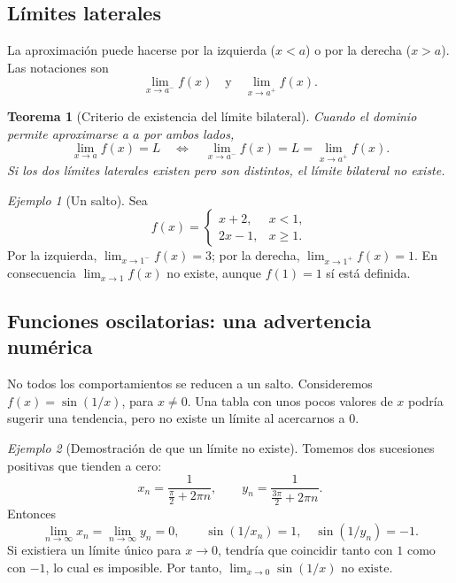 \documentclass[12pt]{article}
\newtheorem{teorema}[definicion]{Teorema}
\theoremstyle{remark}
\newtheorem{ejemplo}{Ejemplo}
\begin{document}
\subsection*{Límites laterales}
La aproximación puede hacerse por la izquierda ($x<a$) o por la derecha ($x>a$). Las notaciones son
\[
 \lim_{x\to a^-}f(x)\quad\text{y}\quad \lim_{x\to a^+}f(x).
\]
\begin{teorema}[Criterio de existencia del límite bilateral]
Cuando el dominio permite aproximarse a $a$ por ambos lados,
\[
 \boxed{\lim_{x\to a}f(x)=L\quad\Longleftrightarrow\quad
 \lim_{x\to a^-}f(x)=L=\lim_{x\to a^+}f(x).}
\]
Si los dos límites laterales existen pero son distintos, el límite bilateral no existe.
\end{teorema}

\begin{ejemplo}[Un salto]
Sea
\[
 f(x)=\begin{cases}x+2,&x<1,\\ 2x-1,&x\ge1.\end{cases}
\]
Por la izquierda, $\lim_{x\to1^-}f(x)=3$; por la derecha, $\lim_{x\to1^+}f(x)=1$. En consecuencia $\lim_{x\to1}f(x)$ no existe, aunque $f(1)=1$ sí está definida.
\end{ejemplo}

\begin{center}
\end{center}

\subsection*{Funciones oscilatorias: una advertencia numérica}
No todos los comportamientos se reducen a un salto. Consideremos $f(x)=\sin(1/x)$, para $x\ne0$. Una tabla con unos pocos valores de $x$ podría sugerir una tendencia, pero no existe un límite al acercarnos a $0$.

\begin{ejemplo}[Demostración de que un límite no existe]
Tomemos dos sucesiones positivas que tienden a cero:
\[
 x_n=\frac{1}{\frac\pi2+2\pi n},\qquad
 y_n=\frac{1}{\frac{3\pi}2+2\pi n}.
\]
Entonces
\[
 \lim_{n\to\infty}x_n=\lim_{n\to\infty}y_n=0,
 \qquad \sin(1/x_n)=1,\quad \sin(1/y_n)=-1.
\]
Si existiera un límite único para $x\to0$, tendría que coincidir tanto con $1$ como con $-1$, lo cual es imposible. Por tanto, $\boxed{\lim_{x\to0}\sin(1/x)\text{ no existe}.}$
\end{ejemplo}
\end{document}
